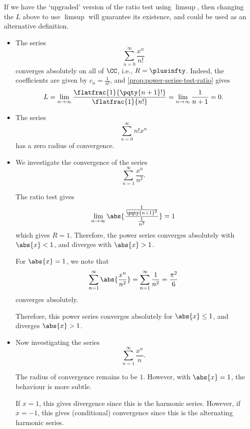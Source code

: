 \begin{remark}
    If we have the `upgraded' version of the ratio test using \(\limsup\), then changing the \(L\) above to use \(\limsup\) will guarantee its existence, and could be used as an alternative definition.
\end{remark}

\begin{examples}
    \label{ex:radius-of-convergence}%
    \begin{itemize}
        \item The series
        \[
            \sum_{n = 0}^{\infty} \frac{x^n}{n!}
        \]
        converges absolutely on all of \(\CC\), i.e., \(R = \plusinfty\). Indeed, the coefficients are given by \(c_n = \frac{1}{n!}\), and \autoref{prop:power-series-test-ratio} gives
        \[
            L = \lim_{n \to \infty} \frac{\flatfrac{1}{\pqty{n + 1}!}}{\flatfrac{1}{n!}} = \lim_{n \to \infty} \frac{1}{n + 1} = 0.
        \]
        
        \item The series
        \[
            \sum_{n = 0}^{\infty} n! x^n
        \]
        has a zero radius of convergence.

        \item We investigate the convergence of the series
        \[
            \sum_{n = 1}^{\infty} \frac{x^n}{n^2}.
        \]

        The ratio test gives
        \[
            \lim_{n \to \infty} \abs{\frac{\frac{1}{\pqty{n + 1}^2}}{\frac{1}{n^2}}} = 1
        \]
        which gives \(R = 1\). Therefore, the power series converges absolutely with \(\abs{x} < 1\), and diverges with \(\abs{x} > 1\).

        For \(\abs{x} = 1\), we note that
        \[
            \sum_{n = 1}^{\infty} \abs{\frac{x^n}{n^2}} = \sum_{n = 1}^{\infty} \frac{1}{n^2} = \frac{\pi^2}{6}
        \]
        converges absolutely.

        Therefore, this power series converges absolutely for \(\abs{x} \leq 1\), and diverges \(\abs{x} > 1\).

        \item Now investigating the series
        \[
            \sum_{n = 1}^{\infty} \frac{x^n}{n}.
        \]

        The radius of convergence remains to be \(1\). However, with \(\abs{x} = 1\), the behaviour is more subtle.

        If \(x = 1\), this gives divergence since this is the harmonic series. However, if \(x = -1\), this gives (conditional) convergence since this is the alternating harmonic series.
    \end{itemize}
\end{examples}


